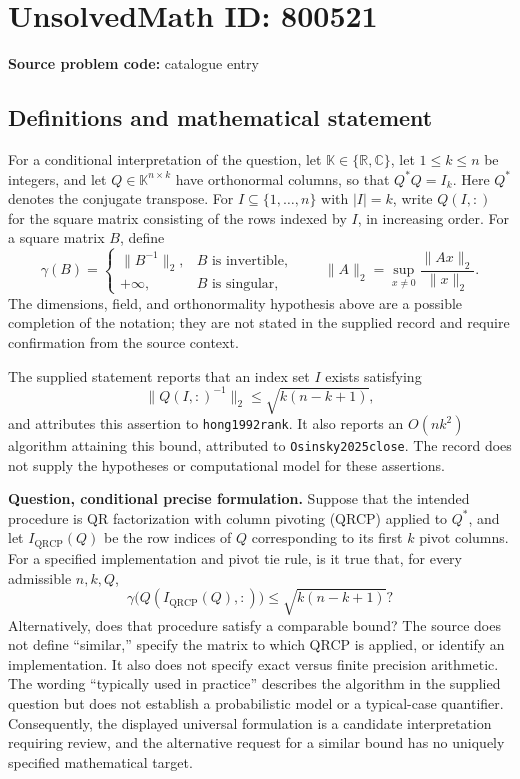 \documentclass[11pt]{article}
\newcommand{\R}{\mathbb{R}}
\newcommand{\C}{\mathbb{C}}
\begin{document}
\section*{UnsolvedMath ID: 800521}
\textbf{Source problem code:} catalogue entry
\subsection{Definitions and mathematical statement}
For a conditional interpretation of the question, let \(\mathbb K\in\{\R,\C\}\), let \(1\le k\le n\) be integers, and let \(Q\in\mathbb K^{n\times k}\) have orthonormal columns, so that \(Q^*Q=I_k\). Here \(Q^*\) denotes the conjugate transpose. For \(I\subseteq\{1,\ldots,n\}\) with \(|I|=k\), write \(Q(I,:)\) for the square matrix consisting of the rows indexed by \(I\), in increasing order. For a square matrix \(B\), define
\[
\gamma(B)=\begin{cases}
\|B^{-1}\|_2,&B\text{ is invertible},\\
+\infty,&B\text{ is singular},
\end{cases}
\qquad
\|A\|_2=\sup_{x\ne0}\frac{\|Ax\|_2}{\|x\|_2}.
\]
The dimensions, field, and orthonormality hypothesis above are a possible completion of the notation; they are not stated in the supplied record and require confirmation from the source context.

The supplied statement reports that an index set \(I\) exists satisfying
\[
\|Q(I,:)^{-1}\|_2\le\sqrt{k(n-k+1)},
\]
and attributes this assertion to \texttt{hong1992rank}. It also reports an \(O(nk^2)\) algorithm attaining this bound, attributed to \texttt{Osinsky2025close}. The record does not supply the hypotheses or computational model for these assertions.

\textbf{Question, conditional precise formulation.} Suppose that the intended procedure is QR factorization with column pivoting (QRCP) applied to \(Q^*\), and let \(I_{\mathrm{QRCP}}(Q)\) be the row indices of \(Q\) corresponding to its first \(k\) pivot columns. For a specified implementation and pivot tie rule, is it true that, for every admissible \(n,k,Q\),
\[
\gamma\bigl(Q(I_{\mathrm{QRCP}}(Q),:)\bigr)
\le\sqrt{k(n-k+1)}?
\]
Alternatively, does that procedure satisfy a comparable bound? The source does not define ``similar,'' specify the matrix to which QRCP is applied, or identify an implementation. It also does not specify exact versus finite precision arithmetic. The wording ``typically used in practice'' describes the algorithm in the supplied question but does not establish a probabilistic model or a typical-case quantifier. Consequently, the displayed universal formulation is a candidate interpretation requiring review, and the alternative request for a similar bound has no uniquely specified mathematical target.
\end{document}
